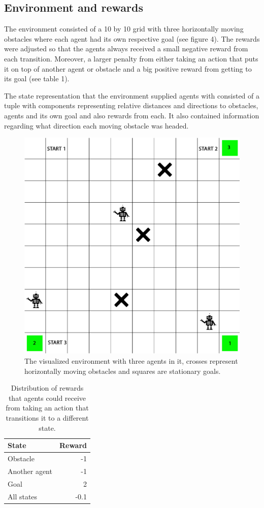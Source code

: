 \documentclass[journal,twoside]{IEEEtran}
\begin{document}
\subsection{Environment and rewards}

The environment consisted of a 10 by 10 grid with three horizontally moving obstacles where each agent had its own respective goal (see figure 4). The rewards were adjusted so that the agents always received a small negative reward from each transition. Moreover, a larger penalty from either taking an action that puts it on top of another agent or obstacle and a big positive reward from getting to its goal (see table 1).

The state representation that the environment supplied agents with consisted of a tuple with components representing relative distances and directions to obstacles, agents and its own goal and also rewards from each. It also contained information regarding what direction each moving obstacle was headed.

\begin{figure}[!h]
	\centering
	\includegraphics[width=0.9\columnwidth]{Grid}
	\caption{The visualized environment with three agents in it, crosses represent horizontally moving obstacles and squares are stationary goals.}
	\label{fig_sim}
\end{figure}

\begin{table}[h!]
	\begin{center}
		\caption{Distribution of rewards that agents could receive from taking an action that transitions it to a different state.}
		\label{tab:table1}
		\begin{tabular}{l|r}
			\textbf{State} & \textbf{Reward} \\
			\hline
			Obstacle & -1\\
			Another agent & -1\\
			Goal & 2\\
			All states & -0.1\\
		\end{tabular}
	\end{center}
\end{table}
\end{document}
